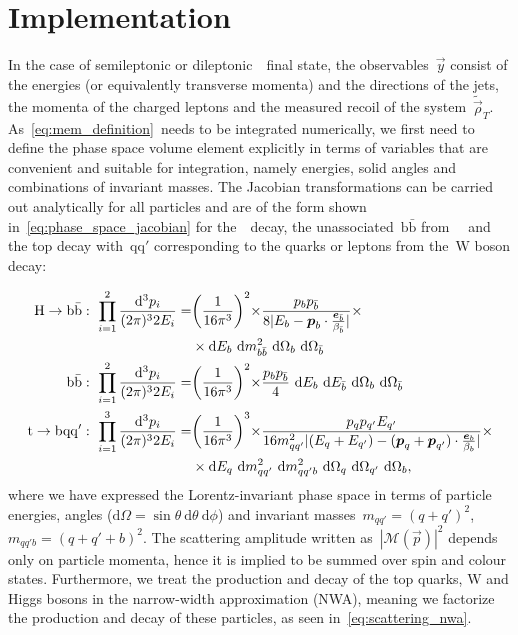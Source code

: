 \section{Implementation}
\label{sec:mem_implementation}
In the case of semileptonic or dileptonic~\ttH~final state, the observables~$\vec{y}$ consist of the energies (or equivalently transverse momenta) and the directions of the jets, the momenta of the charged leptons and the measured recoil of the system~$\tilde{\vec{\rho}}_T$. As~\cref{eq:mem_definition}~needs to be integrated numerically, we first need to define the phase space volume element explicitly in terms of variables that are convenient and suitable for integration, namely energies, solid angles and combinations of invariant masses. The Jacobian transformations can be carried out analytically for all particles and are of the form shown in~\cref{eq:phase_space_jacobian} for the~\Hbb~decay, the unassociated~$\mathrm{b}\bar{\mathrm{b}}$ from~\ttbb~ and the top decay with~$\mathrm{qq'}$ corresponding to the quarks or leptons from the~$\mathrm{W}$ boson decay:

\begin{align}
\label{eq:phase_space_jacobian}
\mathrm{H} \rightarrow \mathrm{b}\bar{\mathrm{b}}:\ \prod_{i=1}^{2} \frac{\mathrm{d}^3 p_i}{(2\pi)^3 2 E_i} =& \biggr(\frac{1}{16 \pi^3}\biggl)^2 \times \frac{p_b p_{\bar{b}}}{8 |E_b - \boldsymbol{p}_b \cdot \frac{\boldsymbol{e}_{\bar{b}}}{\beta_{\bar{b}}}|} \times \\
&\times\mathrm{d}E_{b}~\mathrm{d}m^2_{b\bar{b}}~\mathrm{d}\Omega_{b}~\mathrm{d}\Omega_{\bar{b}} \\
\mathrm{b}\bar{\mathrm{b}}:\ \prod_{i=1}^{2} \frac{\mathrm{d}^3 p_i}{(2\pi)^3 2 E_i} =& \biggr(\frac{1}{16 \pi^3}\biggl)^2 \times \frac{p_b p_{\bar{b}}}{4}~\mathrm{d}E_{b}~\mathrm{d}E_{\bar{b}}~\mathrm{d}\Omega_{b}~\mathrm{d}\Omega_{\bar{b}} \\
\mathrm{t} \rightarrow \mathrm{b}\mathrm{q}\mathrm{q}':\ \prod_{i=1}^{3} \frac{\mathrm{d}^3 p_i}{(2\pi)^3 2 E_i} =& \biggr(\frac{1}{16 \pi^3}\biggl)^3 \times \frac{p_q p_{q'} E_{q'}}{16 m_{qq'}^2 |(E_q + E_{q'}) - (\boldsymbol{p}_q + \boldsymbol{p}_{q'})\cdot \frac{\boldsymbol{e}_b}{\beta_b}|}\times\\
&\times\mathrm{d}E_{q}~\mathrm{d}m^2_{qq'}~\mathrm{d}m^2_{qq'b}~\mathrm{d}\Omega_{q}~\mathrm{d}\Omega_{q'}~\mathrm{d}\Omega_b,
\end{align}
where we have expressed the Lorentz-invariant phase space in terms of particle energies, angles ($\mathrm{d}\Omega = \sin{\theta}~\mathrm{d}\theta~\mathrm{d}\phi$) and invariant masses~$m_{qq'} = (q+q')^2$,~$m_{qq'b} = (q + q' + b)^2$.
The scattering amplitude written as~$|\mathcal{M}(\vec{p})|^2$ depends only on particle momenta, hence it is implied to be summed over spin and colour states. Furthermore, we treat the production and decay of the top quarks, W and Higgs bosons in the narrow-width approximation (NWA), meaning we factorize the production and decay of these particles, as seen in~\cref{eq:scattering_nwa}.

